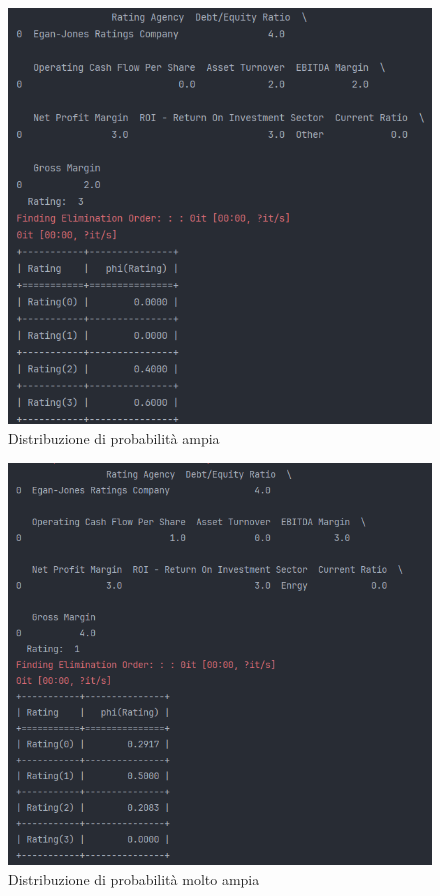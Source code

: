 \begin{figure}[H]
    \centering
    \includegraphics[scale=0.5]{img/so_so.png}
    \caption{Distribuzione di probabilità ampia}
    \label{fig:so}
\end{figure}
\begin{figure}[H]
    \centering
    \includegraphics[scale=0.5]{img/bad_prob.png}
    \caption{Distribuzione di probabilità molto ampia}
    \label{fig:bad}
\end{figure}

